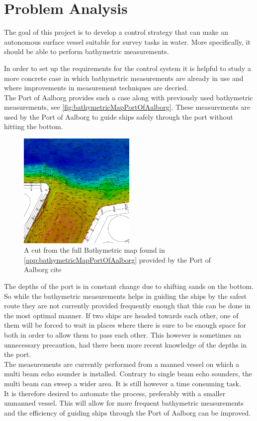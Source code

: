 \chapter{Problem Analysis}
%
The goal of this project is to develop a control strategy that can make an autonomous surface vessel suitable for survey tasks in water. More specifically, it should be able to perform bathymetric measurements.

In order to set up the requirements for the control system it is helpful to study a more concrete case in which bathymetric measurements are already in use and where improvements in measurement techniques are decried.\\
The Port of Aalborg provides such a case along with previously used bathymetric measurements, see \autoref{fig:bathymetricMapPortOfAalborg}. These measurements are used by the Port of Aalborg to guide ships safely through the port without hitting the bottom.

\begin{figure}[H]
  \includegraphics[width=0.5\textwidth]{figures/smallDebthMapAalborg}
  \caption{A cut from the full Bathymetric map found in \autoref{app:bathymetricMapPortOfAalborg} provided by the Port of Aalborg cite}
  \label{fig:bathymetricMapPortOfAalborg}
\end{figure}

The depths of the port is in constant change due to shifting sands on the bottom. So while the bathymetric measurements helps in guiding the ships by the safest route they are not currently provided frequently enough that this can be done in the most optimal manner. If two ships are headed towards each other, one of them will be forced to wait in places where there is sure to be enough space for both in order to allow them to pass each other. This however is sometimes an unnecessary precaution, had there been more recent knowledge of the depths in the port.\\
The measurements are currently performed from a manned vessel on which a multi beam echo sounder is installed. Contrary to single beam echo sounders, the multi beam can sweep a wider area. It is still however a time consuming task.\\
It is therefore desired to automate the process, preferably with a smaller unmanned vessel. This will allow for more frequent bathymetric measurements and the efficiency of guiding ships through the Port of Aalborg can be improved.

